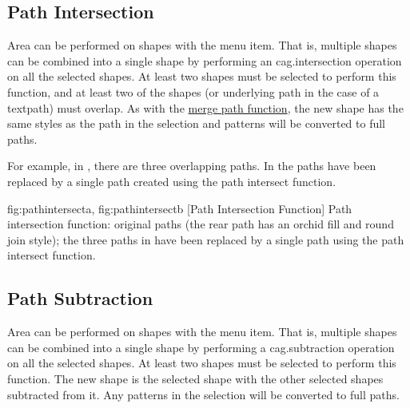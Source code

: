 
\subsection{Path Intersection}\label{sec:pathintersect}


Area  can be performed on \glspl{shape} with
the  menu item. That is, multiple \glspl{shape}
can be combined into a single \gls*{shape} by performing an
\gls{cag.intersection} operation on all the selected \glspl*{shape}.  At
least two \glspl*{shape} must be selected to perform this function, 
and at least two of the shapes (or underlying path
in the case of a \gls{textpath}) must overlap.
As with the \hyperref[sec:mergepaths]{merge path function}, the new
\gls*{shape} has the same styles as the 
path in the selection and \glspl{pattern} will be converted to full
\glspl{path}.

For example, in ,
there are three overlapping paths.  In
 the paths have been replaced by
a single path created using the path intersect function.

{
  {fig:pathintersecta}{}{},
  {fig:pathintersectb}{}{}
}
[Path Intersection Function]
{Path intersection function: 
 original paths (the rear path has 
an orchid fill  and round join style); 
 the three paths 
in  have been
replaced by a single path using the path intersect function.}


\subsection{Path Subtraction}\label{sec:pathsubtract}


Area  can be performed on \glspl{shape} with
the  menu item. That is, multiple \glspl{shape}
can be combined into a single \gls*{shape} by performing a
\gls{cag.subtraction} operation on all the selected \glspl*{shape}.  At
least two \glspl*{shape} must be selected to perform this function.
The new shape is the  selected shape with
the other selected shapes subtracted from it. Any \glspl{pattern} in
the selection will be converted to full paths.

